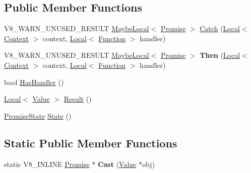 \subsection*{Public Member Functions}
\begin{DoxyCompactItemize}
\item 
V8\+\_\+\+W\+A\+R\+N\+\_\+\+U\+N\+U\+S\+E\+D\+\_\+\+R\+E\+S\+U\+LT \mbox{\hyperlink{classv8_1_1MaybeLocal}{Maybe\+Local}}$<$ \mbox{\hyperlink{classv8_1_1Promise}{Promise}} $>$ \mbox{\hyperlink{classv8_1_1Promise_ab5b9bc0140b750cbf569f3a0e6c92b42}{Catch}} (\mbox{\hyperlink{classv8_1_1Local}{Local}}$<$ \mbox{\hyperlink{classv8_1_1Context}{Context}} $>$ context, \mbox{\hyperlink{classv8_1_1Local}{Local}}$<$ \mbox{\hyperlink{classv8_1_1Function}{Function}} $>$ handler)
\item 
\mbox{\label{classv8_1_1Promise_af043d82818e1bbaf6c659e40bcf86c89}} 
V8\+\_\+\+W\+A\+R\+N\+\_\+\+U\+N\+U\+S\+E\+D\+\_\+\+R\+E\+S\+U\+LT \mbox{\hyperlink{classv8_1_1MaybeLocal}{Maybe\+Local}}$<$ \mbox{\hyperlink{classv8_1_1Promise}{Promise}} $>$ {\bfseries Then} (\mbox{\hyperlink{classv8_1_1Local}{Local}}$<$ \mbox{\hyperlink{classv8_1_1Context}{Context}} $>$ context, \mbox{\hyperlink{classv8_1_1Local}{Local}}$<$ \mbox{\hyperlink{classv8_1_1Function}{Function}} $>$ handler)
\item 
bool \mbox{\hyperlink{classv8_1_1Promise_aeea8bdfdbe2291632d7f0d45394c1722}{Has\+Handler}} ()
\item 
\mbox{\hyperlink{classv8_1_1Local}{Local}}$<$ \mbox{\hyperlink{classv8_1_1Value}{Value}} $>$ \mbox{\hyperlink{classv8_1_1Promise_a94aceab6e2ad55f37e6997b4dcac2f11}{Result}} ()
\item 
\mbox{\hyperlink{classv8_1_1Promise_a0c357b9d99a634f98a5a203b0a322544}{Promise\+State}} \mbox{\hyperlink{classv8_1_1Promise_abc011691f131e23939b167a4fe3f9391}{State}} ()
\end{DoxyCompactItemize}
\subsection*{Static Public Member Functions}
\begin{DoxyCompactItemize}
\item 
\mbox{\label{classv8_1_1Promise_adfa3b953beb2678dd3b5d6ddb3f0746d}} 
static V8\+\_\+\+I\+N\+L\+I\+NE \mbox{\hyperlink{classv8_1_1Promise}{Promise}} $\ast$ {\bfseries Cast} (\mbox{\hyperlink{classv8_1_1Value}{Value}} $\ast$obj)
\end{DoxyCompactItemize}
